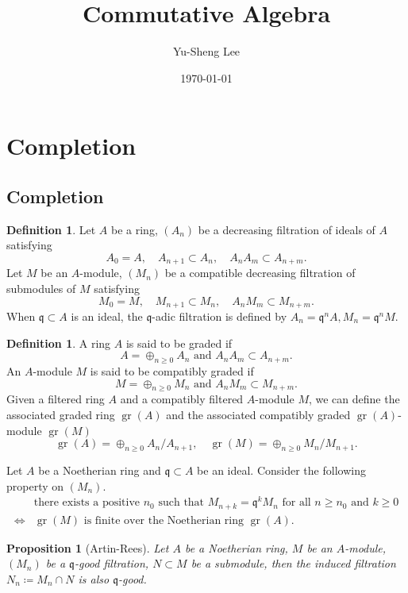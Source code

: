 \documentclass[leqno]{amsart}
\DeclareMathOperator{\gr}{gr}
\newcommand{\1}{\mathbf{1}}
\newcommand{\fq}{\mathfrak q}
\newtheorem{prop}[thm]{Proposition}
\theoremstyle{definition}
\newtheorem{defn}[thm]{Definition}
\theoremstyle{remark}
\begin{document}
\title{Commutative Algebra}
\author[Y-S.~Lee]{Yu-Sheng Lee}
\address{Department of Mathematics, University  of Michigan, Ann Arbor, MI 48109, USA}
\date{\today}

\maketitle
\setcounter{tocdepth}{1}
\tableofcontents


\section{Completion}
\subsection{Completion}
\begin{defn}
	Let $A$ be a ring,
	$(A_n)$ be a decreasing filtration of ideals of $A$ satisfying
	\[
		A_{0}=A,\quad
		A_{n+1}\subset A_{n},\quad
		A_{n}A_{m}\subset A_{n+m}.
	\]
	Let $M$ be an $A$-module, 
	$(M_n)$ be a compatible decreasing filtration of submodules of $M$ satisfying
	\[
		M_{0}=M,\quad
		M_{n+1}\subset M_{n},\quad
		A_{n}M_{m}\subset M_{n+m}.
	\]
	When $\fq\subset A$ is an ideal, 
	the $\fq$-adic filtration is defined by $A_n=\fq^nA, M_n=\fq^nM$.
\end{defn}
\begin{defn}
	A ring $A$ is said to be graded if
	\[
		A=\oplus_{n\geq 0} A_n \text{ and } A_nA_m\subset A_{n+m}.
	\]
	An $A$-module $M$ is said to be compatibly graded if
	\[
		M=\oplus_{n\geq 0} M_n \text{ and } A_nM_m\subset M_{n+m}.
	\]
Given a filtered ring $A$ and 
a compatibly filtered $A$-module $M$, 
we can define the associated graded ring $\gr(A)$
and the associated compatibly graded $\gr(A)$-module $\gr(M)$
 \[
	 \gr(A)=\oplus_{n\geq 0}A_n/A_{n+1},\quad
	 \gr(M)=\oplus_{n\geq 0}M_n/M_{n+1}.
\]
\end{defn}
Let $A$ be a Noetherian ring
and $\fq\subset A$ be an ideal.
Consider the following property on $(M_n)$.
\begin{align*}\tag{$\fq$-good}
	&\text{there exists a positive $n_{0}$ such that }
	M_{n+k}=\fq^kM_{n} \text{ for all }
	n\geq n_0 \text{ and } k\geq 0\\
	\Longleftrightarrow
	&\gr(M) \text{ is finite over the Noetherian ring } \gr(A).
\end{align*}
\begin{prop}[Artin-Rees]
	Let $A$ be a Noetherian ring,
	$M$ be an $A$-module,
	$(M_n)$ be a $\fq$-good filtration,
	$N\subset M$ be a submodule,
	then the induced filtration $N_n\coloneqq M_n\cap N$
	is also  $\fq$-good.
\end{prop}
\end{document}
